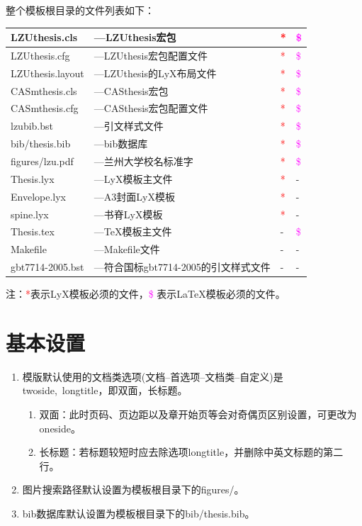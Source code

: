 \documentclass[twoside,longtitle]{LZUthesis}
\begin{document}
整个模板根目录的文件列表如下：

\begin{tabular}{|l|l|l|l|}
\hline
LZUthesis.cls & ---LZUthesis宏包 & \textcolor{red}{{*}} & \textcolor{magenta}{\$}\tabularnewline
\hline
LZUthesis.cfg & ---LZUthesis宏包配置文件 & \textcolor{red}{{*}} & \textcolor{magenta}{\$}\\
\hline
LZUthesis.layout & ---LZUthesis的LyX布局文件 & \textcolor{red}{{*}} & \textcolor{magenta}{\$}\\
\hline
CASmthesis.cls & ---CASthesis宏包 & \textcolor{red}{{*}} & \textcolor{magenta}{\$}\\
\hline
CASmthesis.cfg & ---CASthesis宏包配置文件 & \textcolor{red}{{*}} & \textcolor{magenta}{\$}\\
\hline
lzubib.bst & ---引文样式文件 & \textcolor{red}{{*}} & \textcolor{magenta}{\$}\\
\hline
bib/thesis.bib & ---bib数据库 & \textcolor{red}{{*}} & \textcolor{magenta}{\$}\\
\hline
figures/lzu.pdf & ---兰州大学校名标准字 & \textcolor{red}{{*}} & \textcolor{magenta}{\$}\\
\hline
Thesis.lyx & ---LyX模板主文件 & \textcolor{red}{{*}} & -\\
\hline
Envelope.lyx & ---A3封面LyX模板 & \textcolor{red}{{*}} & -\\
\hline
spine.lyx & ---书脊LyX模板 & \textcolor{red}{{*}} & -\\
\hline
Thesis.tex & ---\TeX{}模板主文件 & - & \textcolor{magenta}{\$}\\
\hline
Makefile & ---Makefile文件 & - & -\\
\hline
gbt7714-2005.bst & ---符合国标gbt7714-2005的引文样式文件 & - & -\\
\hline
\end{tabular}

注：\textcolor{red}{{*}}表示LyX模板必须的文件，\textcolor{magenta}{\$} 表示\LaTeX{}模板必须的文件。


\section{基本设置}
\begin{enumerate}
\item 模版默认使用的文档类选项(文档--首选项--文档类--自定义)是twoside,~longtitle，即双面，长标题。

\begin{enumerate}
\item 双面：此时页码、页边距以及章开始页等会对奇偶页区别设置，可更改为oneside。
\item 长标题：若标题较短时应去除选项longtitle，并删除中英文标题的第二行。
\end{enumerate}
\item 图片搜索路径默认设置为模板根目录下的figures/。
\item bib数据库默认设置为模板根目录下的bib/thesis.bib。
\end{enumerate}
\end{document}
